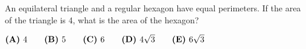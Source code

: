

An equilateral triangle and a regular hexagon have equal perimeters. If the area of the triangle is 4, what is the area of the hexagon?

$\textbf{(A)}\hspace{.05in}4 \qquad \textbf{(B)}\hspace{.05in}5 \qquad \textbf{(C)}\hspace{.05in}6 \qquad \textbf{(D)}\hspace{.05in}4\sqrt3 \qquad \textbf{(E)}\hspace{.05in}6\sqrt3 $
